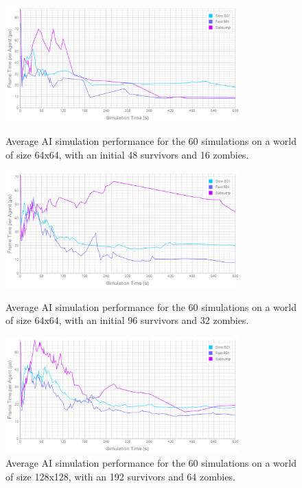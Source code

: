 \documentclass[12pt,a4paper]{article}
\begin{document}
\begin{figure}
\vspace{-20mm}
\centering
\includegraphics[width=0.8\textwidth]{../../Results/64_48_16/performance}
\caption{\small Average AI simulation performance for the 60 simulations on a world of size 64x64, with an initial 48 survivors and 16 zombies.}

\vspace{5mm}
\includegraphics[width=0.8\textwidth]{../../Results/64_96_32/performance}
\caption{\small Average AI simulation performance for the 60 simulations on a world of size 64x64, with an initial 96 survivors and 32 zombies.}

\vspace{5mm}
\includegraphics[width=0.8\textwidth]{../../Results/128_192_64/performance}
\caption{\small Average AI simulation performance for the 60 simulations on a world of size 128x128, with an 192 survivors and 64 zombies.}
\end{figure}
\end{document}

